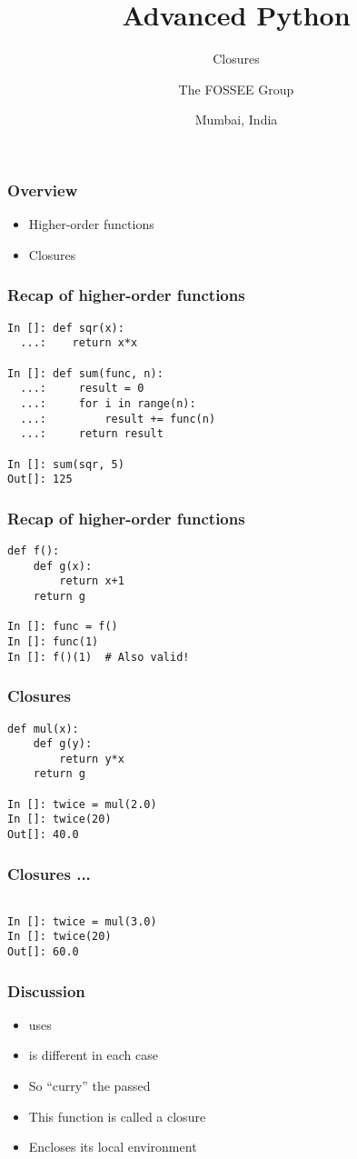 \documentclass[14pt,compress,aspectratio=169]{beamer}
\title[Closures]{Advanced Python}
\subtitle{Closures}
\author[FOSSEE] {The FOSSEE Group}
\institute[IIT Bombay] {Department of Aerospace Engineering\\IIT Bombay}
\date[] {Mumbai, India}
\begin{document}
\begin{frame}
  \titlepage
\end{frame}

\begin{frame}
  \frametitle{Overview}
  \begin{itemize}
  \item Higher-order functions
  \item Closures
  \end{itemize}
\end{frame}

\begin{frame}[fragile]
  \frametitle{Recap of higher-order functions}
  \begin{lstlisting}
In []: def sqr(x):
  ...:    return x*x

In []: def sum(func, n):
  ...:     result = 0
  ...:     for i in range(n):
  ...:         result += func(n)
  ...:     return result

In []: sum(sqr, 5)
Out[]: 125
  \end{lstlisting}
\end{frame}

\begin{frame}[fragile]
  \frametitle{Recap of higher-order functions}
  \begin{lstlisting}
def f():
    def g(x):
        return x+1
    return g

In []: func = f()
In []: func(1)
In []: f()(1)  # Also valid!
  \end{lstlisting}
\end{frame}


\begin{frame}[fragile]
  \frametitle{Closures}
  \begin{lstlisting}
def mul(x):
    def g(y):
        return y*x
    return g

In []: twice = mul(2.0)
In []: twice(20)
Out[]: 40.0
  \end{lstlisting}
\end{frame}

\begin{frame}[fragile]
  \frametitle{Closures ...}
  \begin{lstlisting}

In []: twice = mul(3.0)
In []: twice(20)
Out[]: 60.0
  \end{lstlisting}
\end{frame}

\begin{frame}
  \frametitle{Discussion}
  \begin{itemize}
  \item {} uses 
  \item {} is different in each case
  \item So  ``curry'' the passed 
  \item This function is called a closure
  \item Encloses its local environment
  \end{itemize}
\end{frame}
\end{document}
